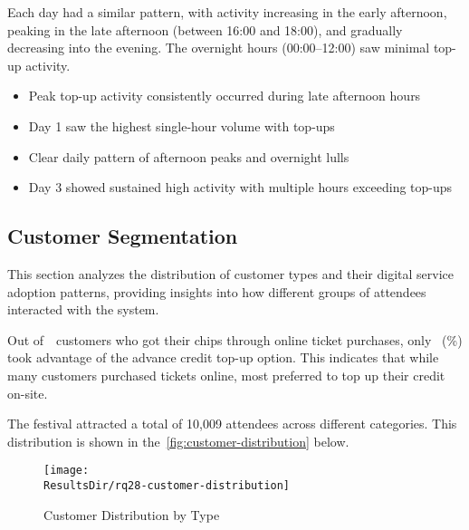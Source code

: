 Each day had a similar pattern, with activity increasing in the early afternoon, peaking in the late afternoon (between 16:00 and 18:00), and gradually decreasing into the evening.
The overnight hours (00:00–12:00) saw minimal top-up activity.

\begin{keytakeaways}
	\begin{itemize}
		\item Peak top-up activity consistently occurred during late afternoon hours
		\item Day 1 saw the highest single-hour volume with  top-ups
		\item Clear daily pattern of afternoon peaks and overnight lulls
		\item Day 3 showed sustained high activity with multiple hours exceeding  top-ups
	\end{itemize}
\end{keytakeaways}


\subsection{Customer Segmentation}
\label{subsec:analysis-customer-segmentation}

This section analyzes the distribution of customer types and their digital service adoption patterns, providing insights into how different groups of attendees interacted with the system.


Out of~~customers who got their chips through online ticket purchases, only ~(\%) took advantage of the advance credit top-up option.
This indicates that while many customers purchased tickets online, most preferred to top up their credit on-site.


The festival attracted a total of 10,009 attendees across different categories.
This distribution is shown in the~\autoref{fig:customer-distribution} below.

\begin{figure}[H]
	\centering
	\texttt{[image: \\ResultsDir/rq28-customer-distribution]}
	\caption{Customer Distribution by Type}
	\label{fig:customer-distribution}
	\source
\end{figure}

